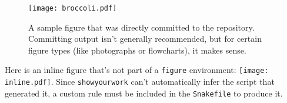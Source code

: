 \documentclass[twocolumn]{aastex631}
\begin{document}
\begin{figure}[ht!]
    \begin{centering}
        \texttt{[image: broccoli.pdf]}
        \caption{
            A sample figure that was directly committed to the repository.
            Committing output isn't generally recommended, but for certain figure types (like photographs or flowcharts), it makes sense.
        }
        \label{fig*:broccoli}
    \end{centering}
\end{figure}

Here is an inline figure that's not part of a \verb+figure+ environment: \texttt{[image: inline.pdf]}. Since \texttt{showyourwork} can't automatically infer the script that generated it, a custom rule must be included in the \texttt{Snakefile} to produce it.
\end{document}
